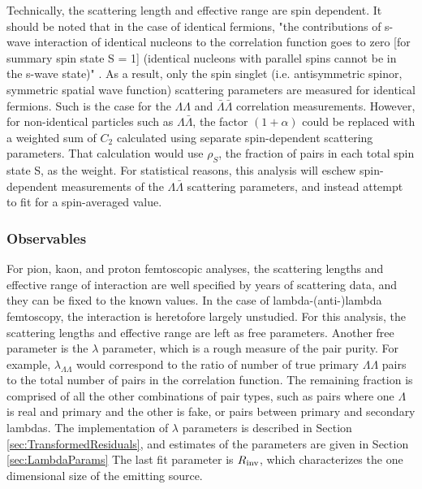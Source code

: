 Technically, the scattering length and effective range are spin dependent.  
It should be noted that in the case of identical fermions, "the contributions of s-wave interaction of identical nucleons to the correlation function goes to zero [for summary spin state S = 1] (identical nucleons with parallel spins cannot be in the s-wave state)" \cite{lednicky82}.  
As a result, only the spin singlet (i.e. antisymmetric spinor, symmetric spatial wave function) scattering parameters are measured for identical fermions.  
Such is the case for the $\Lambda\Lambda$ and $\bar{\Lambda}\bar{\Lambda}$ correlation measurements.  
However, for non-identical particles such as $\Lambda\bar{\Lambda}$, the factor $(1+\alpha)$ could be replaced with a weighted sum of $C_2$ calculated using separate spin-dependent scattering parameters.  
That calculation would use $\rho_S$, the fraction of pairs in each total spin state S, as the weight.  
For statistical reasons, this analysis will eschew spin-dependent measurements of the $\Lambda\bar{\Lambda}$ scattering parameters, and instead attempt to fit for a spin-averaged value.


\subsubsection{Observables}
\label{sec:Observables}
For pion, kaon, and proton femtoscopic analyses, the scattering lengths and effective range of interaction are well specified by years of scattering data, and they can be fixed to the known values.  
In the case of lambda-(anti-)lambda femtoscopy, the interaction is heretofore largely unstudied.  
For this analysis, the scattering lengths and effective range are left as free parameters.  
Another free parameter is the $\lambda$ parameter, which is a rough measure of the pair purity.  
For example, $\lambda_{\Lambda\Lambda}$ would correspond to the ratio of number of true primary $\Lambda\Lambda$ pairs to the total number of pairs in the correlation function. 
The remaining fraction is comprised of all the other combinations of pair types, such as pairs where one $\Lambda$ is real and primary and the other is fake, or pairs between primary and secondary lambdas.  
The implementation of $\lambda$ parameters is described in Section \ref{sec:TransformedResiduals}, and estimates of the parameters are given in Section \ref{sec:LambdaParams}
The last fit parameter is $R_{\rm inv}$, which characterizes the one dimensional size of the emitting source.  


